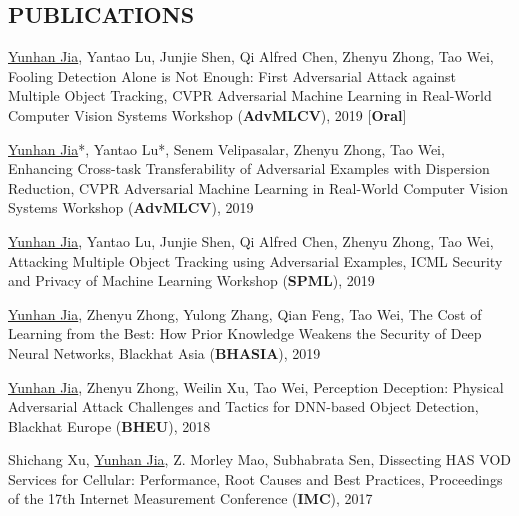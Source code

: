 \documentclass[margin]{res}
\begin{document}
\begin{resume}
\section{PUBLICATIONS}
\underline{Yunhan Jia}, Yantao Lu, Junjie Shen, Qi Alfred Chen, Zhenyu Zhong, Tao Wei,
Fooling Detection Alone is Not Enough: First Adversarial Attack against Multiple Object Tracking, CVPR Adversarial Machine Learning in Real-World Computer Vision Systems Workshop (\textbf{AdvMLCV}), 2019 [\textbf{Oral}] \href{https://arxiv.org/pdf/1905.11026.pdf}{\color{blue}{[PDF]}}

\underline{Yunhan Jia}*, Yantao Lu*, Senem Velipasalar, Zhenyu Zhong, Tao Wei, Enhancing Cross-task Transferability of Adversarial Examples with Dispersion Reduction, CVPR Adversarial Machine Learning in Real-World Computer Vision Systems Workshop (\textbf{AdvMLCV}), 2019 \href{https://arxiv.org/pdf/1905.03333.pdf}{\color{blue}{[PDF]}}


\underline{Yunhan Jia}, Yantao Lu, Junjie Shen, Qi Alfred Chen, Zhenyu Zhong, Tao Wei,
Attacking Multiple Object Tracking using Adversarial Examples, ICML Security and Privacy of Machine Learning Workshop (\textbf{SPML}), 2019 \href{https://github.com/jiayunhan/jiayunhan.github.io/blob/master/material/fooling_spml19.pdf}{\color{blue}{[Poster]}}

\underline{Yunhan Jia}, Zhenyu Zhong, Yulong Zhang, Qian Feng, Tao Wei,
The Cost of Learning from the Best: How Prior Knowledge Weakens the Security of Deep Neural Networks, Blackhat Asia (\textbf{BHASIA}), 2019 \href{http://i.blackhat.com/asia-19/Thu-March-28/bh-asia-Jia-the-Cost-of-Learning-From-the-Best-How-Prior-Knowledge-Weakens-the-Security-of-Deep-Neural-Networks.pdf}{\color{blue}{[Slides]}}

\underline{Yunhan Jia}, Zhenyu Zhong, Weilin Xu, Tao Wei,
Perception Deception: Physical Adversarial Attack Challenges and Tactics for DNN-based Object Detection, Blackhat Europe (\textbf{BHEU}), 2018 \href{http://i.blackhat.com/eu-18/Thu-Dec-6/eu-18-Zhong-Perception-Deception-Physical-Adversarial-Attack-Challenges-and-Tactics-for-DNN-Based-Object-Detection.pdf}{\color{blue}{[Slides]}}

Shichang Xu, \underline{Yunhan Jia}, Z. Morley Mao, Subhabrata Sen,
Dissecting HAS VOD Services for Cellular: Performance, Root Causes and Best Practices, Proceedings of the 17th Internet Measurement Conference (\textbf{IMC}), 2017 \href{https://conferences.sigcomm.org/imc/2017/papers/imc17-final111.pdf}{\color{blue}{[PDF]}}


\end{resume}
\end{document}
